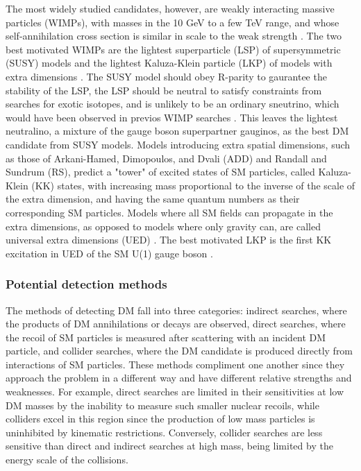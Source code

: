 \indent The most widely studied candidates, however, are weakly interacting massive particles (WIMPs), with masses in the 10 GeV to a few TeV range, and whose self-annihilation cross section is similar in scale to the weak strength \cite{Bertone:2004pz}. The two best motivated WIMPs are the lightest superparticle (LSP) of supersymmetric (SUSY) models \cite{Jungman:1995df} and the lightest Kaluza-Klein particle (LKP) of models with extra dimensions \cite{Kolb:1983fm}. The SUSY model should obey R-parity to gaurantee the stability of the LSP, the LSP should be neutral to satisfy constraints from searches for exotic isotopes, and is unlikely to be an ordinary sneutrino, which would have been observed in previos WIMP searches \cite{Agashe:2014kda}. This leaves the lightest neutralino, a mixture of the gauge boson superpartner gauginos, as the best DM candidate from SUSY models. Models introducing extra spatial dimensions, such as those of Arkani-Hamed, Dimopoulos, and Dvali (ADD) \cite{ArkaniHamed:1998rs} and Randall and Sundrum (RS)\cite{Randall:1999ee}, predict a "tower" of excited states of SM particles, called Kaluza-Klein (KK) states, with increasing mass proportional to the inverse of the scale of the extra dimension, and having the same quantum numbers as their corresponding SM particles. Models where all SM fields can propagate in the extra dimensions, as opposed to models where only gravity can, are called universal extra dimensions (UED) \cite{Appelquist:2000nn}. The best motivated LKP is the first KK excitation in UED of the SM U(1) gauge boson \cite{Cheng:2002iz}. 

\subsubsection{Potential detection methods}

The methods of detecting DM fall into three categories: indirect searches, where the products of DM annihilations or decays are observed, direct searches, where the recoil of SM particles is measured after scattering with an incident DM particle, and collider searches, where the DM candidate is produced directly from interactions of SM particles. These methods compliment one another since they approach the problem in a different way and have different relative strengths and weaknesses. For example, direct searches are limited in their sensitivities at low DM masses by the inability to measure such smaller nuclear recoils, while colliders excel in this region since the production of low mass particles is uninhibited by kinematic restrictions. Conversely, collider searches are less sensitive than direct and indirect searches at high mass, being limited by the energy scale of the collisions.

